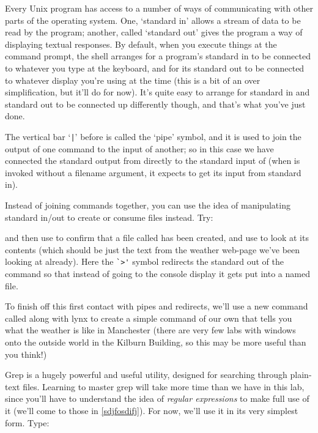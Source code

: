 Every Unix program has access to a number of ways of communicating with other parts of the operating system. One, `standard in' allows a stream of data to be read by the program; another, called `standard out' gives the program a way of displaying textual responses. By default, when you execute things at the command prompt, the shell arranges for a program's standard in to be connected to whatever you type at the keyboard, and for its standard out to be connected to whatever display you're using at the time (this is a bit of an over simplification, but it'll do for now). It's quite easy to arrange for standard in and standard out to be connected up differently though, and that's what you've just done.

The vertical bar `\verb-|-' before  is called the `pipe' symbol, and it is used to join the output of one command to the input of another; so in this case we have connected the standard output from  directly to the standard input of  (when  is invoked without a filename argument, it expects to get its input from standard in). 

Instead of joining commands together, you can use the idea of manipulating standard in/out to create or consume files instead. Try:


and then use  to confirm that a file called  has been created, and use  to look at its contents (which should be just the text from the weather web-page we've been looking at already). Here the \verb-`>'- symbol redirects the standard out of the  command so that instead of going to the console display it gets put into a named file. 

To finish off this first contact with pipes and redirects, we'll use a new command called  along with lynx to create a simple command of our own that tells you what the weather is like in Manchester (there are very few labs with windows onto the outside world in the Kilburn Building, so this may be more useful than you think!) 

Grep is a hugely powerful and useful utility, designed for searching through plain-text files. Learning to master grep will take more time than we have in this lab, since you'll have to understand the idea of \textit{regular expressions} to make full use of it (we'll come to those in \ref{sdjfosdifj}). For now, we'll use it in its very simplest form. Type:

